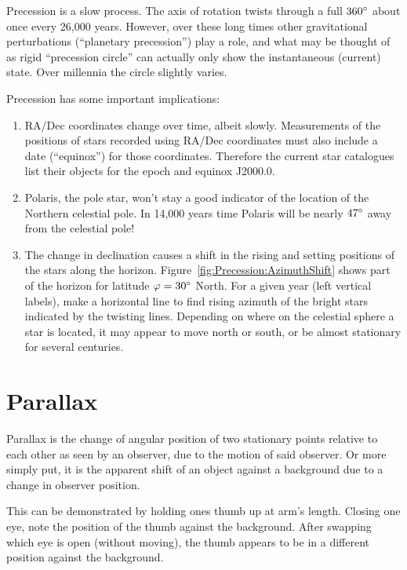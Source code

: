 Precession is a slow process. The axis of rotation twists through a
full $360\degree$ about once every 26,000 years. However, over these
long times other gravitational perturbations (``planetary
precession'') play a role, and what may be thought of as rigid
``precession circle'' can actually only show the instantaneous
(current) state. Over millennia the circle slightly varies.

Precession has some important implications:

\begin{enumerate}
\item RA/Dec coordinates change over time, albeit slowly. Measurements
  of the positions of stars recorded using RA/Dec coordinates must
  also include a date (``equinox'') for those coordinates. Therefore
  the current star catalogues list their objects for the epoch and
  equinox J2000.0.
\item Polaris, the pole star, won't stay a good indicator of the
  location of the Northern celestial pole. In 14,000 years time
  Polaris will be nearly $47\degree$ away from the celestial pole!
\item The change in declination causes a shift in the rising and
  setting positions of the stars along the
  horizon. Figure~\ref{fig:Precession:AzimuthShift} shows part of the
  horizon for latitude $\varphi=30\degree$ North. For a given year
  (left vertical labels), make a horizontal line to find rising
  azimuth of the bright stars indicated by the twisting
  lines. Depending on where on the celestial sphere a star is located,
  it may appear to move north or south, or be almost stationary for
  several centuries.
\end{enumerate}


\section{Parallax}
\label{sec:Concepts:Parallax}


Parallax is the change of angular position of two stationary points
relative to each other as seen by an observer, due to the motion of said
observer. Or more simply put, it is the apparent shift of an object
against a background due to a change in observer position.

This can be demonstrated by holding ones thumb up at arm's length.
Closing one eye, note the position of the thumb against the background.
After swapping which eye is open (without moving), the thumb appears to
be in a different position against the background.

